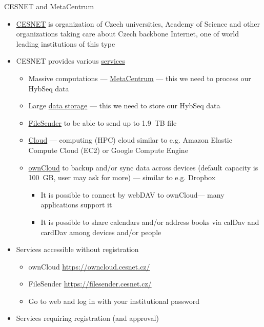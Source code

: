 \documentclass[compress, ucs, xelatex, 11pt, xcolor=x11names, aspectratio=1609,
	hyperref={
		bookmarks=true,
		unicode=true,
		colorlinks=true,
		pdftitle={HybSeq course},
		plainpages=false,
		pdfauthor={Vojtech Zeisek},
		pdfsubject={Practical processing of HybSeq target enrichment sequencing data on computing grids like MetaCentrum},
		pdfcreator={XeLaTeX},
		pdfkeywords={BASH, command line, GNU, HybSeq, Linux, MetaCentrum, sequencing shell, target enrichment},
		linkcolor=Cyan2, %
		anchorcolor=Firebrick2, %
		citecolor=Firebrick2, %
		filecolor=Firebrick2, %
		menucolor=Firebrick2, %
		urlcolor=Chartreuse2, %
		pdftex},
	url={hyphens, lowtilde} %
	]{beamer}
\renewcommand{\alert}[1]{\textcolor{OrangeRed2}{#1}}
\begin{document}
\begin{frame}[allowframebreaks]{CESNET and MetaCentrum}
	\label{CESNET}
	\begin{itemize}
		\item \href{https://www.cesnet.cz/?lang=en}{CESNET} is organization of Czech universities, Academy of Science and other organizations taking care about Czech backbone Internet, one of world leading institutions of this type
		\item CESNET provides various \href{https://www.cesnet.cz/services/?lang=en}{services}
		\begin{itemize}
			\item Massive computations --- \href{https://www.cesnet.cz/services/massive-computations-metacentrum/?lang=en}{MetaCentrum} --- \alert{this we need to process our HybSeq data}
			\item Large \href{https://www.cesnet.cz/services/data-storage/?lang=en}{data storage} --- \alert{this we need to store our HybSeq data}
			\item \href{https://www.cesnet.cz/services/filesender/?lang=en}{FileSender} to be able to send up to 1.9~TB file
			\item \href{https://www.metacentrum.cz/en/Sluzby/Cloud/}{Cloud} --- computing (HPC) cloud similar to e.g. Amazon Elastic Compute Cloud (EC2) or Google Compute Engine
			\item \href{https://www.cesnet.cz/services/owncloud/?lang=en}{ownCloud} to backup and/or sync data across devices (default capacity is 100~GB, user may ask for more) --- similar to e.g. Dropbox
			\begin{itemize}
				\item It is possible to connect by webDAV to ownCloud--- many applications support it
				\item It is possible to share calendars and/or address books via calDav and cardDav among devices and/or people
			\end{itemize}
		\end{itemize}
		\item Services accessible without registration
		\begin{itemize}
			\item ownCloud \url{https://owncloud.cesnet.cz/}
			\item FileSender \url{https://filesender.cesnet.cz/}
			\item Go to web and log in with your institutional password
		\end{itemize}
		\item Services requiring registration (and approval)

\end{itemize}
\end{frame}
\end{document}
